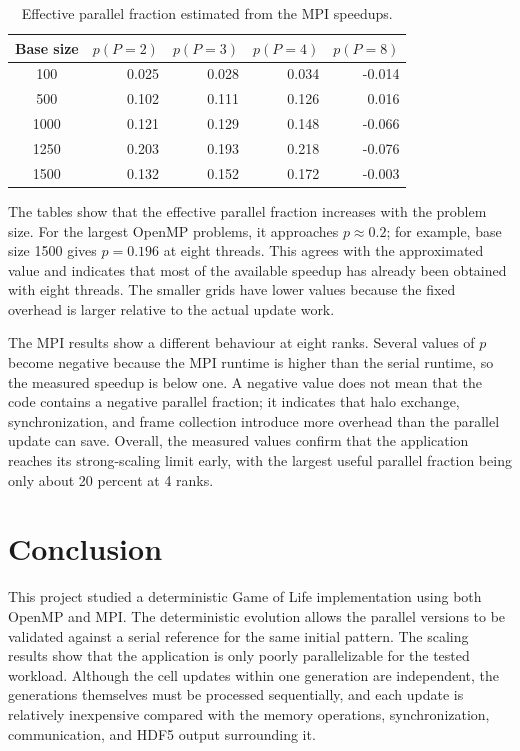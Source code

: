 \documentclass[11pt,a4paper]{article}
\begin{document}
\begin{table}[ht]
    \centering
    \caption{Effective parallel fraction estimated from the MPI speedups.}
    \label{tab:mpi-p}
    \begin{tabular}{c|rrrr}
        \toprule
        Base size & $p(P=2)$ & $p(P=3)$ & $p(P=4)$ & $p(P=8)$ \\
        \midrule
        100  & 0.025 & 0.028 & 0.034 & -0.014 \\
        500  & 0.102 & 0.111 & 0.126 &  0.016 \\
        1000 & 0.121 & 0.129 & 0.148 & -0.066 \\
        1250 & 0.203 & 0.193 & 0.218 & -0.076 \\
        1500 & 0.132 & 0.152 & 0.172 & -0.003 \\
        \bottomrule
    \end{tabular}
\end{table}


The tables show that the effective parallel fraction increases with the problem
size. For the largest OpenMP problems, it approaches $p\approx0.2$; for
example, base size 1500 gives $p=0.196$ at eight threads. This agrees with the
approximated value and indicates that most of the
available speedup has already been obtained with eight threads. The smaller
grids have lower values because the fixed overhead is larger relative to the
actual update work.

The MPI results show a different behaviour at eight ranks. Several values of
$p$ become negative because the MPI runtime is higher than the serial runtime,
so the measured speedup is below one. A negative value does not mean that the
code contains a negative parallel fraction; it indicates that halo exchange,
synchronization, and frame collection introduce more overhead than the
parallel update can save. Overall, the measured values confirm that the
application reaches its strong-scaling limit early, with the largest useful
parallel fraction being only about 20 percent at 4 ranks.

\section{Conclusion}

This project studied a deterministic Game of Life implementation using both
OpenMP and MPI. The deterministic evolution allows the parallel versions to be
validated against a serial reference for the same initial pattern. The scaling
results show that the application is only poorly parallelizable for the tested
workload. Although the cell updates within one generation are independent, the
generations themselves must be processed sequentially, and each update is
relatively inexpensive compared with the memory operations, synchronization,
communication, and HDF5 output surrounding it.
\end{document}
